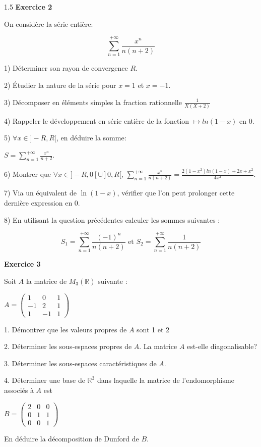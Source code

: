 \documentclass[12pt]{article}
\begin{document}
\begin{spacing}{1.5}
\medskip\textbf{Exercice 2 }

On considère la série entière:

\[\sum_{n=1}^{+\infty}\frac{x^n}{n(n+2)}\]

1) Déterminer son rayon de convergence $R$.

2) Étudier la nature de la série pour $x=1$ et $x=-1$.

3) Décomposer en éléments simples la fraction rationnelle $\frac{1}{X(X+2)}$

4) Rappeler le développement en série entière de la fonction $\longmapsto ln(1-x)$ en 0.

5) $\forall x\in ]-R,R[$, en déduire la somme:

$S=\sum_{n=1}^{+\infty}\frac{x^n}{n+2}$.

6) Montrer que $\forall x\in ]-R,0[\cup ]0,R[$, $\sum_{n=1}^{+\infty}\frac{x^n}{n(n+2)}=\frac{2(1-x^2)ln(1-x)+2x+x^2}{4x^2}$.

7) Via un équivalent de $\ln(1-x)$, vérifier que l'on peut prolonger cette dernière expression en 0.

8) En utilisant la question précédentes calculer les sommes suivantes :

\[S_1=\sum_{n=1}^{+\infty}\frac{(-1)^n}{n(n+2)} \text{ et } S_2=\sum_{n=1}^{+\infty}\frac{1}{n(n+2)}\]

\medskip\textbf{Exercice 3 }

Soit $A$ la matrice de $M_3(\mathbb{R})$ suivante :

			$A=\begin{pmatrix}
			1 & 0 & 1 \\ 
			-1 & 2 & 1 \\ 
			1 & -1 & 1
			\end{pmatrix} $
			
1. Démontrer que les valeurs propres de $A$ sont 1 et 2

2. Déterminer les sous-espaces propres de $A$. La matrice $A$ est-elle diagonalisable?

3. Déterminer les sous-espaces caractéristiques de $A$.

4. Déterminer une base de $\mathbb{R}^3$ dans laquelle la matrice de l'endomorphisme associés à $A$ est

$B=\begin{pmatrix}
2 & 0 & 0 \\ 
0 & 1 & 1 \\ 
0 & 0 & 1
\end{pmatrix}$

En déduire la décomposition de Dunford de $B$.


\end{spacing}
\end{document}
